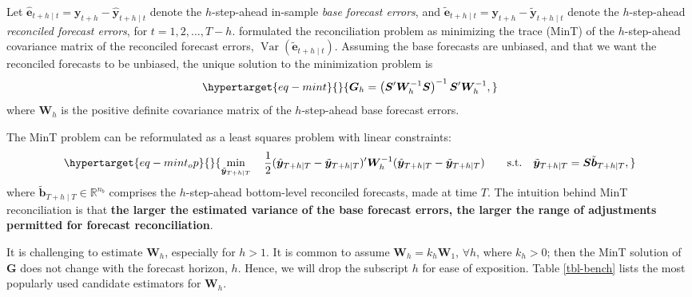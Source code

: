 \documentclass[
  11pt]{article}
\begin{document}
Let
\(\hat{\bm{e}}_{t+h \mid t} = \bm{y}_{t+h} - \hat{\bm{y}}_{t+h \mid t}\)
denote the \(h\)-step-ahead in-sample \emph{base forecast errors}, and
\(\tilde{\bm{e}}_{t+h \mid t} = \bm{y}_{t+h} - \tilde{\bm{y}}_{t+h \mid t}\)
denote the \(h\)-step-ahead \emph{reconciled forecast errors}, for
\(t = 1,2,\ldots,T-h\). \citet{Wickramasuriya2019-fc} formulated the
reconciliation problem as minimizing the trace (MinT) of the
\(h\)-step-ahead covariance matrix of the reconciled forecast errors,
\(\operatorname{Var}(\tilde{\bm{e}}_{t+h \mid t})\). Assuming the base
forecasts are unbiased, and that we want the reconciled forecasts to be
unbiased, the unique solution to the minimization problem is
\begin{equation}\protect\hypertarget{eq-mint}{}{
\bm{G}_h=\left(\bm{S}^{\prime} \bm{W}_h^{-1} \bm{S}\right)^{-1} \bm{S}^{\prime} \bm{W}_h^{-1},
}\label{eq-mint}\end{equation} where \(\bm{W}_h\) is the positive
definite covariance matrix of the \(h\)-step-ahead base forecast errors.

The MinT problem can be reformulated as a least squares problem with
linear constraints: \begin{equation}\protect\hypertarget{eq-mint_op}{}{
\min_{\tilde{\bm{y}}_{T+h \mid T}} \quad \frac{1}{2}(\hat{\bm{y}}_{T+h \mid T}-\tilde{\bm{y}}_{T+h \mid T})^{\prime} \bm{W}_{h}^{-1}(\hat{\bm{y}}_{T+h \mid T}-\tilde{\bm{y}}_{T+h \mid T})
 \qquad \text{s.t.} \quad \tilde{\bm{y}}_{T+h \mid T}=\bm{S}\tilde{\bm{b}}_{T+h \mid T},
}\label{eq-mint_op}\end{equation} where
\(\tilde{\bm{b}}_{T+h \mid T} \in \mathbb{R}^{n_b}\) comprises the
\(h\)-step-ahead bottom-level reconciled forecasts, made at time \(T\).
The intuition behind MinT reconciliation is that \textbf{the larger the
estimated variance of the base forecast errors, the larger the range of
adjustments permitted for forecast reconciliation}.

It is challenging to estimate \(\bm{W}_h\), especially for \(h > 1\). It
is common to assume \(\bm{W}_h = k_h\bm{W}_1\), \(\forall h\), where
\(k_h > 0\); then the MinT solution of \(\bm{G}\) does not change with
the forecast horizon, \(h\). Hence, we will drop the subscript \(h\) for
ease of exposition. Table \ref{tbl-bench} lists the most popularly used
candidate estimators for \(\bm{W}_h\).
\end{document}
